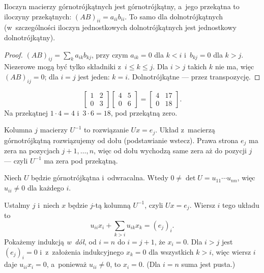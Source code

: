 \documentclass[11pt]{article}
\begin{document}
\begin{teoria}
\begin{lemat}\label{lem:iloczyn}
Iloczyn macierzy górnotrójkątnych jest górnotrójkątny, a~jego przekątna
to iloczyny przekątnych: $(AB)_{ii}=a_{ii}b_{ii}$. To samo dla
dolnotrójkątnych (w~szczególności iloczyn jednostkowych dolnotrójkątnych
jest jednostkowy dolnotrójkątny).
\end{lemat}
\begin{proof}
$(AB)_{ij}=\sum_ka_{ik}b_{kj}$, przy czym $a_{ik}=0$ dla $k<i$
i~$b_{kj}=0$ dla $k>j$. Niezerowe mogą być tylko składniki z~$i\le k\le j$.
Dla $i>j$ takich $k$ nie ma, więc $(AB)_{ij}=0$; dla $i=j$ jest jeden:
$k=i$. Dolnotrójkątne --- przez transpozycję.
\end{proof}
\end{teoria}

\begin{przyklad}
\[
\begin{bmatrix}1&2\\0&3\end{bmatrix}
\begin{bmatrix}4&5\\0&6\end{bmatrix}
=\begin{bmatrix}4&17\\0&18\end{bmatrix}.
\]
Na przekątnej $1\cdot4=4$ i~$3\cdot6=18$, pod przekątną zero.
\end{przyklad}

\begin{intuicja}
Kolumna $j$ macierzy $U^{-1}$ to rozwiązanie $Ux=e_j$. Układ z~macierzą
górnotrójkątną rozwiązujemy od dołu (podstawianie wstecz). Prawa strona
$e_j$ ma zera na pozycjach $j+1,\ldots,n$, więc od dołu wychodzą same
zera aż do pozycji $j$ --- czyli $U^{-1}$ ma zera pod przekątną.
\end{intuicja}

\formalnie
Niech $U$ będzie górnotrójkątna i~odwracalna. Wtedy
$0\ne\det U=u_{11}\cdots u_{nn}$, więc $u_{ii}\ne0$ dla każdego $i$.

Ustalmy $j$ i~niech $x$ będzie $j$-tą kolumną $U^{-1}$, czyli $Ux=e_j$.
Wiersz $i$ tego układu to
\[
u_{ii}x_i+\sum_{k>i}u_{ik}x_k=(e_j)_i.
\]
Pokażemy indukcją \emph{w~dół}, od $i=n$ do $i=j+1$, że $x_i=0$.
Dla $i>j$ jest $(e_j)_i=0$ i~z~założenia indukcyjnego $x_k=0$ dla
wszystkich $k>i$, więc wiersz $i$ daje $u_{ii}x_i=0$, a~ponieważ
$u_{ii}\ne0$, to $x_i=0$. (Dla $i=n$ suma jest pusta.)
\end{document}
